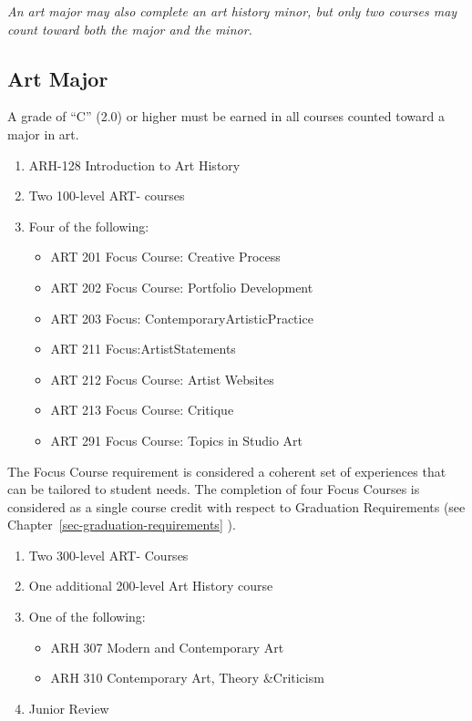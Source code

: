 \documentclass[
  letterpaper,
]{scrbook}
\providecommand{\tightlist}{%
  \setlength{\itemsep}{0pt}\setlength{\parskip}{0pt}}
\begin{document}
\emph{An art major may also complete an art history minor, but only two
courses may count toward both the major and the minor.}

\subsection{Art Major}\label{art-major}

A grade of ``C'' (2.0) or higher must be earned in all courses counted
toward a major in art.

\begin{enumerate}
\def\labelenumi{\arabic{enumi}.}
\tightlist
\item
  ARH-128 Introduction to Art History
\item
  Two 100-level ART- courses
\item
  Four of the following:

  \begin{itemize}
  \tightlist
  \item
    ART 201 Focus Course: Creative Process
  \item
    ART 202 Focus Course: Portfolio Development
  \item
    ART 203 Focus: ContemporaryArtisticPractice
  \item
    ART 211 Focus:ArtistStatements
  \item
    ART 212 Focus Course: Artist Websites
  \item
    ART 213 Focus Course: Critique
  \item
    ART 291 Focus Course: Topics in Studio Art
  \end{itemize}
\end{enumerate}

The Focus Course requirement is considered a coherent set of experiences
that can be tailored to student needs. The completion of four Focus
Courses is considered as a single course credit with respect to
Graduation Requirements (see Chapter~\ref{sec-graduation-requirements}
).

\begin{enumerate}
\def\labelenumi{\arabic{enumi}.}
\setcounter{enumi}{3}
\tightlist
\item
  Two 300-level ART- Courses
\item
  One additional 200-level Art History course
\item
  One of the following:

  \begin{itemize}
  \tightlist
  \item
    ARH 307 Modern and Contemporary Art
  \item
    ARH 310 Contemporary Art, Theory \&Criticism
  \end{itemize}
\item
  Junior Review
\end{enumerate}
\end{document}
